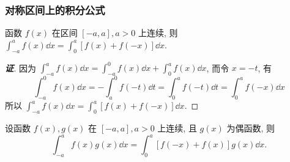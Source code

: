 \subsubsection{对称区间上的积分公式}
\begin{theorem}
    函数 $f(x)$ 在区间 $[-a,a],a>0$ 上连续, 则 $\displaystyle \int_{-a}^{a}f(x)\dd x=\int_{0}^{a}[f(x)+f(-x)]\dd x.$
\end{theorem}
\begin{proof}[{\songti \textbf{证}}]
    因为 $\displaystyle\int_{-a}^{a}f(x)\dd x=\int_{-a}^{0}f(x)\dd x+\int_{0}^{a}f(x)\dd x$, 而令 $x=-t$, 有
    $$\int_{-a}^{0}f(x)\dd x=-\int_{a}^{0}f(-t)\dd t=\int_{0}^{a}f(-t)\dd t=\int_{0}^{a}f(-x)\dd x$$
    所以 $\displaystyle\int_{-a}^{a}f(x)\dd x=\int_{0}^{a}[f(x)+f(-x)]\dd x.$
\end{proof}
\begin{inference}
    \label{-aafgdx}
    设函数 $f(x),g(x)$ 在 $[-a,a],a>0$ 上连续, 且 $g(x)$ 为偶函数, 则 $$\displaystyle\int_{-a}^{a}f(x)g(x)\dd x=\int_{0}^{a}[f(-x)+f(x)]g(x)\dd x.$$
\end{inference}

